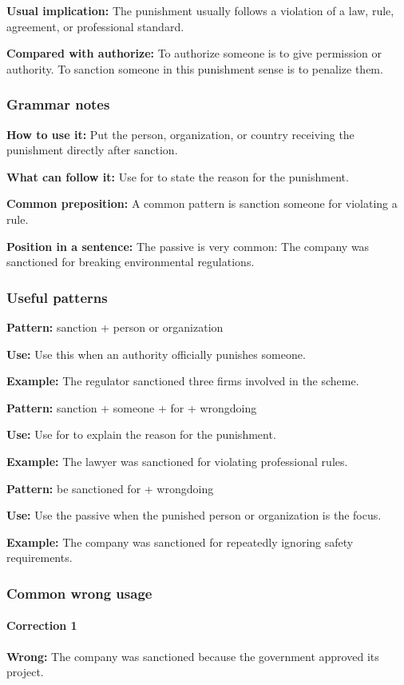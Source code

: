 \documentclass[11pt]{article}
\begin{document}
\textbf{Usual implication:} The punishment usually follows a violation of a law, rule, agreement, or professional standard.

\textbf{Compared with authorize:} To authorize someone is to give permission or authority. To sanction someone in this punishment sense is to penalize them.

\subsubsection{Grammar notes}
\textbf{How to use it:} Put the person, organization, or country receiving the punishment directly after sanction.

\textbf{What can follow it:} Use for to state the reason for the punishment.

\textbf{Common preposition:} A common pattern is sanction someone for violating a rule.

\textbf{Position in a sentence:} The passive is very common: The company was sanctioned for breaking environmental regulations.

\subsubsection{Useful patterns}
\textbf{Pattern:} sanction + person or organization

\textbf{Use:} Use this when an authority officially punishes someone.

\textbf{Example:} The regulator sanctioned three firms involved in the scheme.

\textbf{Pattern:} sanction + someone + for + wrongdoing

\textbf{Use:} Use for to explain the reason for the punishment.

\textbf{Example:} The lawyer was sanctioned for violating professional rules.

\textbf{Pattern:} be sanctioned for + wrongdoing

\textbf{Use:} Use the passive when the punished person or organization is the focus.

\textbf{Example:} The company was sanctioned for repeatedly ignoring safety requirements.

\subsubsection{Common wrong usage}
\paragraph{Correction 1}
\textbf{Wrong:} The company was sanctioned because the government approved its project.
\end{document}
